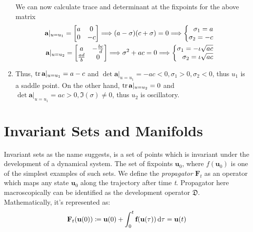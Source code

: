 \begin{enumerate}
 We can now calculate trace and determinant at the fixpoints for the above matrix
\begin{equation}
	\begin{split}		 
	 	\normalfont\textbf{a}\vert_{u = u_{1}}=
	 	\begin{bmatrix}
	 	a & 0 \\
	 	0 & -c
	 	\end{bmatrix}
	 	\Longrightarrow (a - \sigma)(c + \sigma) = 0 \Longrightarrow 
	 	\begin{cases}
		 	\begin{aligned}
			 \sigma_{1} = a \\
			 \sigma_{2} =-c
		 	\end{aligned}
	 	\end{cases}
	 \\
		 \normalfont\textbf{a}\vert_{u = u_{2}}=
		 \begin{bmatrix}
			 a & -\frac{bc}{d} \\
			 \frac{ad}{b} & 0
		 \end{bmatrix}
		 \Longrightarrow \sigma^{2} + ac = 0 \Longrightarrow 
		\begin{cases}
			 \begin{aligned}
				 \sigma_{1} = -\iota\sqrt{ac} \\
				 \sigma_{2} =\iota\sqrt{ac}
			 \end{aligned}
		 \end{cases}
	\end{split}
\end{equation}

\item Thus, $ \operatorname{tr} \textbf{a}\vert_{u = u_{1}} = a - c $ and $ \det \textbf{a}\vert_{u = u_{1}} = -ac <0, \sigma_{1} > 0, \sigma_{2} <0 $, thus $\textit{u}_{1}$ is a saddle point. On the other hand, $ \operatorname{tr} \textbf{a}\vert_{u = u_{2}} = 0 $ and $ \det \textbf{a}\vert_{u = u_{1}} = ac>0, \Im(\sigma)\neq0$, thus $\textit{u}_{2}$ is oscillatory.

\end{enumerate}

\section{Invariant Sets and Manifolds}
Invariant sets as the name suggests, is a set of points which is invariant under the development of a dynamical system. The set of fixpoints $\textbf{u}_{0}$, where $ \textit{f}(\textbf{u}_{0}) $ is one of the simplest examples of such sets.
We define the \textit{propagator} $ \textbf{F}_{t} $ as an operator which maps any state $\textbf{u}_{0}$ along the trajectory after time \textit{t}. Propagator here macroscopically can be identified as the development operator $ \mathfrak{D} $. Mathematically, it’s represented as:
\begin{equation}
	\textbf{F}_{t}(\textbf{u}(0))\coloneqq \textbf{u}(0) + \int_{0}^{t}\textbf{f}(\textbf{u}(\tau)) \mathop{}\!\mathrm{d} \tau = \textbf{u}(t)
\end{equation}

